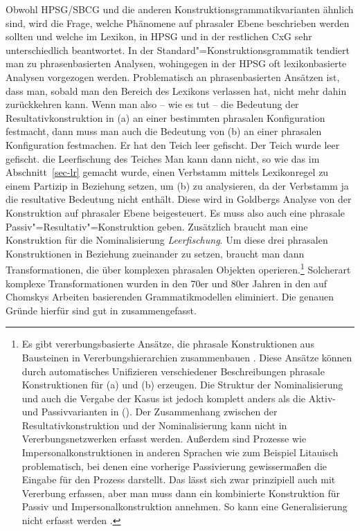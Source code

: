 Obwohl HPSG/SBCG und die anderen Konstruktionsgrammatikvarianten ähnlich sind, wird die Frage, welche Phänomene auf phrasaler Ebene
beschrieben werden sollten und welche im Lexikon, in HPSG und in der restlichen CxG sehr unterschiedlich
beantwortet. In der Standard"=Konstruktionsgrammatik tendiert man zu phrasenbasierten Analysen, wohingegen in
der HPSG oft lexikonbasierte Analysen vorgezogen werden. Problematisch an phrasenbasierten Ansätzen ist, 
dass man, sobald man den Bereich des Lexikons verlassen hat, nicht mehr
dahin zurückkehren kann. Wenn man also -- wie es \citet{Goldberg95a} tut -- die Bedeutung
der Resultativkonstruktion in (a) an einer bestimmten phrasalen Konfiguration festmacht,
dann muss man auch die Bedeutung von (b) an einer phrasalen Konfiguration festmachen.
\eal
\label{bsp-res-passiv}
\ex Er hat den Teich leer gefischt.
\ex Der Teich wurde leer gefischt.
\ex die Leerfischung des Teiches
\zl
\largerpage
Man kann dann nicht, so wie das im Abschnitt~\ref{sec-lr} gemacht wurde, einen Verbstamm
mittels Lexikonregel zu einem Partizip in Beziehung setzen, um (b) zu analysieren,
da der Verbstamm ja die resultative Bedeutung nicht enthält. Diese wird in Goldbergs Analyse
von der Konstruktion auf phrasaler Ebene beigesteuert. Es muss also auch eine phrasale
Passiv"=Resultativ"=Konstruktion geben. Zusätzlich braucht man eine Konstruktion für die
Nominalisierung \emph{Leerfischung}. Um diese drei phrasalen Konstruktionen in Beziehung
zueinander zu setzen, braucht man dann Transformationen, die über komplexen phrasalen
Objekten operieren.\footnote{
  Es gibt vererbungsbasierte Ansätze, die phrasale Konstruktionen aus Bausteinen in
  Vererbungshierarchien zusammenbauen \citep{LK2017a,Seyffarth2023a}. Diese Ansätze können durch automatisches Unifizieren
  verschiedener Beschreibungen phrasale Konstruktionen für (a) und (b) erzeugen. Die
  Struktur der Nominalisierung und auch die Vergabe der Kasus ist jedoch komplett anders als die
  Aktiv- und Passivvarianten in (). Der Zusammenhang zwischen der Resultativkonstruktion und
  der Nominalisierung kann nicht in Vererbungsnetzwerken erfasst werden. Außerdem sind Prozesse wie
  Impersonalkonstruktionen in anderen Sprachen wie zum Beispiel Litauisch problematisch, bei denen
  eine vorherige Passivierung gewissermaßen die Eingabe für den Prozess darstellt. Das lässt sich
  zwar prinzipiell auch mit Vererbung erfassen, aber man muss dann ein kombinierte Konstruktion für
  Passiv und Impersonalkonstruktion annehmen. So kann eine Generalisierung nicht erfasst werden \citep{MuellerUnifying,MuellerLFGTAG,MuellerTAGCxG}.
} Solcherart komplexe Transformationen wurden in den 70er und 80er Jahren
in den auf Chomskys Arbeiten basierenden Grammatikmodellen\indexgb
eliminiert. Die genauen Gründe hierfür sind gut in  zusammengefasst.

